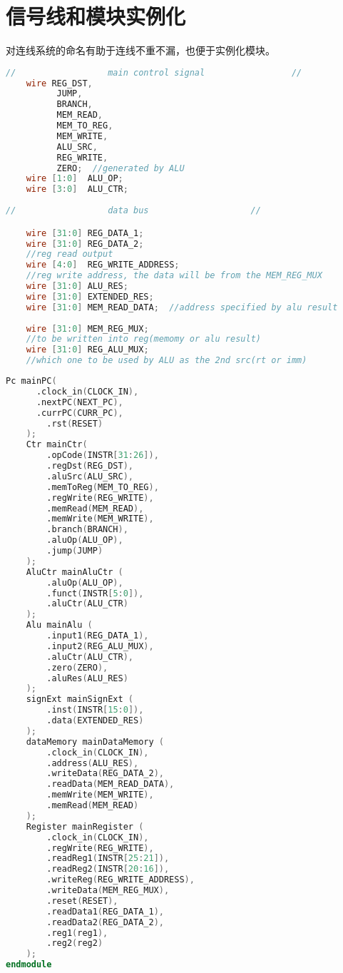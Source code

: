 \documentclass[a4paper]{article}
\begin{document}
\section{信号线和模块实例化}
    对连线系统的命名有助于连线不重不漏，也便于实例化模块。
    \begin{lstlisting}[language={Verilog},title={wire.v}]
//                  main control signal                 //
	wire REG_DST,
		  JUMP,
		  BRANCH,
		  MEM_READ,
		  MEM_TO_REG,
		  MEM_WRITE,
		  ALU_SRC,
		  REG_WRITE,
		  ZERO;  //generated by ALU
	wire [1:0]  ALU_OP;
	wire [3:0]  ALU_CTR;
	
//                  data bus                    //

	wire [31:0] REG_DATA_1;
	wire [31:0] REG_DATA_2;
    //reg read output
	wire [4:0]  REG_WRITE_ADDRESS;
    //reg write address, the data will be from the MEM_REG_MUX
	wire [31:0] ALU_RES;
	wire [31:0] EXTENDED_RES;	
	wire [31:0] MEM_READ_DATA;	//address specified by alu result
	
	wire [31:0] MEM_REG_MUX;	
    //to be written into reg(memomy or alu result)
	wire [31:0] REG_ALU_MUX;
    //which one to be used by ALU as the 2nd src(rt or imm)   \end{lstlisting}
    \begin{lstlisting}[language={Verilog},title={instances.v}]
	Pc mainPC(
      .clock_in(CLOCK_IN),
      .nextPC(NEXT_PC),
      .currPC(CURR_PC),
		.rst(RESET)
    );	
	Ctr mainCtr(
		.opCode(INSTR[31:26]),
		.regDst(REG_DST),
		.aluSrc(ALU_SRC),
		.memToReg(MEM_TO_REG),
		.regWrite(REG_WRITE),
		.memRead(MEM_READ),
		.memWrite(MEM_WRITE),
		.branch(BRANCH),
		.aluOp(ALU_OP),
		.jump(JUMP)
	);	
	AluCtr mainAluCtr (
		.aluOp(ALU_OP),
		.funct(INSTR[5:0]),
		.aluCtr(ALU_CTR)
	);	
	Alu mainAlu (
		.input1(REG_DATA_1),
		.input2(REG_ALU_MUX),
		.aluCtr(ALU_CTR),
		.zero(ZERO),
		.aluRes(ALU_RES)
	);	
	signExt mainSignExt (
		.inst(INSTR[15:0]),
		.data(EXTENDED_RES)
	);	
	dataMemory mainDataMemory (
		.clock_in(CLOCK_IN),
		.address(ALU_RES),
		.writeData(REG_DATA_2),
		.readData(MEM_READ_DATA),
		.memWrite(MEM_WRITE),
		.memRead(MEM_READ)
	);	
	Register mainRegister (
		.clock_in(CLOCK_IN),
		.regWrite(REG_WRITE),
		.readReg1(INSTR[25:21]),
		.readReg2(INSTR[20:16]),
		.writeReg(REG_WRITE_ADDRESS),
		.writeData(MEM_REG_MUX),
		.reset(RESET),
		.readData1(REG_DATA_1),
		.readData2(REG_DATA_2),
		.reg1(reg1),
		.reg2(reg2)
	);	
endmodule   \end{lstlisting}
\end{document}
